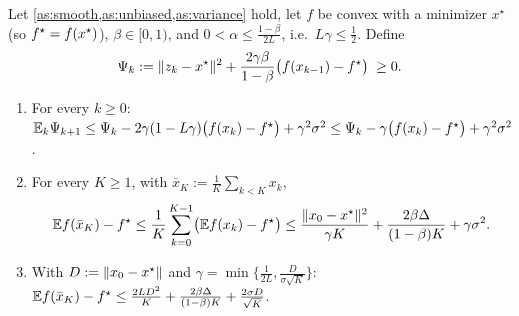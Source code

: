 \begin{tcolorbox}[keybox]
\begin{theorem}\label{thm:convex}
Let \cref{as:smooth,as:unbiased,as:variance} hold, let $f$ be convex with a minimizer
$x^\star$ (so $f^\star=f(x^\star)$), $\beta\in[0,1)$, and $0<\alpha\le\frac{1-\beta}{2L}$, i.e.\
$L\gamma\le\frac12$. Define
\[
  \Psi_k:=\lVert z_k-x^\star\rVert^2+\frac{2\gamma\beta}{1-\beta}\bigl(f(x_{k-1})-f^\star\bigr)\;\ge0 .
\]
\begin{enumerate}[label=\textup{(\alph*)}]
\item For every $k\ge0$:
  $\mathbb{E}_k\Psi_{k+1}\le\Psi_k-2\gamma(1-L\gamma)\bigl(f(x_k)-f^\star\bigr)+\gamma^2\sigma^2
  \le\Psi_k-\gamma\bigl(f(x_k)-f^\star\bigr)+\gamma^2\sigma^2$.
\item For every $K\ge1$, with $\bar x_K:=\frac1K\sum_{k<K}x_k$,
  \[
    \mathbb{E} f(\bar x_K)-f^\star\le\frac1K\sum_{k=0}^{K-1}\bigl(\mathbb{E} f(x_k)-f^\star\bigr)
    \le\frac{\lVert x_0-x^\star\rVert^2}{\gamma K}+\frac{2\beta\Delta}{(1-\beta)K}+\gamma\sigma^2 .
  \]
\item With $D:=\lVert x_0-x^\star\rVert$ and $\gamma=\min\{\frac1{2L},\frac{D}{\sigma\sqrt K}\}$:
  $\mathbb{E} f(\bar x_K)-f^\star\le\frac{2LD^2}{K}+\frac{2\beta\Delta}{(1-\beta)K}+\frac{2\sigma D}{\sqrt K}$.
\end{enumerate}
\end{theorem}
\end{tcolorbox}

